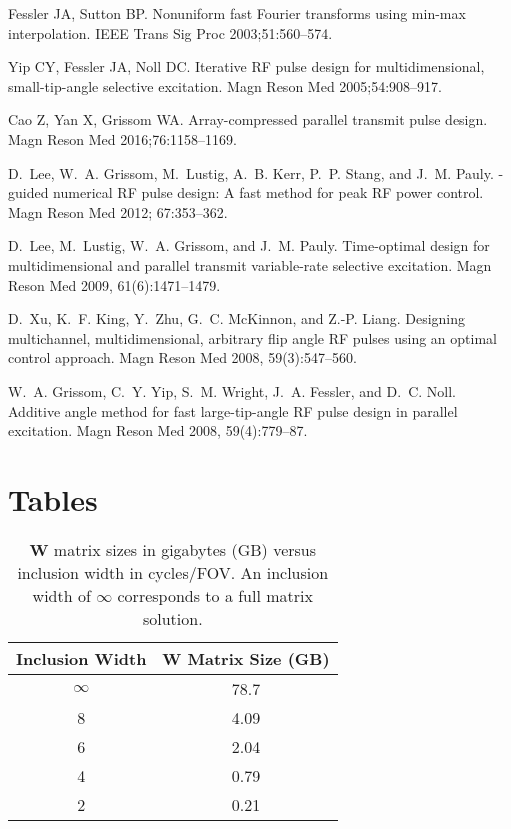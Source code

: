 \documentclass[11pt]{article}
\begin{document}
\begin{thebibliography}{10}
Fessler JA, Sutton BP.
\newblock Nonuniform fast {Fourier} transforms using min-max interpolation.
\newblock IEEE Trans Sig Proc 2003;\hspace{0pt}51:560--574.

Yip CY, Fessler JA, Noll DC.
\newblock Iterative {RF} pulse design for multidimensional, small-tip-angle
  selective excitation.
\newblock Magn Reson Med 2005;\hspace{0pt}54:908--917.

Cao Z, Yan X, Grissom WA.
\newblock Array-compressed parallel transmit pulse design.
\newblock Magn Reson Med 2016;\hspace{0pt}76:1158--1169.

D.~Lee, W.~A. Grissom, M.~Lustig, A.~B. Kerr, P.~P. Stang, and J.~M. Pauly.
-guided numerical {RF} pulse design: A fast method for peak
  {RF} power control.
\newblock Magn Reson Med 2012; 67:353--362.

D.~Lee, M.~Lustig, W.~A. Grissom, and J.~M. Pauly.
\newblock Time-optimal design for multidimensional and parallel transmit
  variable-rate selective excitation.
\newblock Magn Reson Med 2009, 61(6):1471--1479.

D.~Xu, K.~F. King, Y.~Zhu, G.~C. McKinnon, and Z.-P. Liang.
\newblock Designing multichannel, multidimensional, arbitrary flip angle {RF}
  pulses using an optimal control approach.
\newblock Magn Reson Med 2008, 59(3):547--560.

W.~A. Grissom, C.~Y. Yip, S.~M. Wright, J.~A. Fessler, and D.~C. Noll.
\newblock Additive angle method for fast large-tip-angle {RF} pulse design in
  parallel excitation.
\newblock Magn Reson Med 2008, 59(4):779--87.





\end{thebibliography}

\pagebreak

\section*{Tables}

\begin{table}[!h]
\centering
\begin{tabular}{c | c}
Inclusion Width & $\bm{W}$ Matrix Size (GB) \\
\hline
$\infty$ & 78.7 \\
8 & 4.09 \\
6 & 2.04 \\
4 & 0.79 \\
2 & 0.21
\end{tabular}
\caption{$\bm{W}$ matrix sizes in gigabytes (GB) versus inclusion width in cycles/FOV. 
An inclusion width of $\infty$ corresponds to a full matrix solution.}
\label{fig:wsize}
\end{table}
\end{document}
